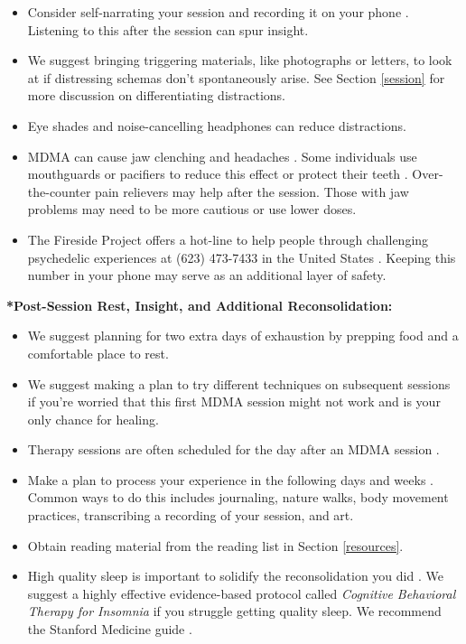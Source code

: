 \documentclass[12pt,letterpaper]{article}
\begin{document}
\begin{itemize}
    \item Consider self-narrating your session and recording it on your phone \cite{mithoeferManual}. Listening to this after the session can spur insight.
    \item We suggest bringing triggering materials, like photographs or letters, to look at if distressing schemas don't spontaneously arise. See Section \ref{session} for more discussion on differentiating distractions.
    \item Eye shades and noise-cancelling headphones can reduce distractions.
    \item MDMA can cause jaw clenching and headaches \cite{mitchellMDMAClinicalTrial2,liechtiGender}. Some individuals use mouthguards or pacifiers to reduce this effect or protect their teeth \cite{emdeEmergency}. Over-the-counter pain relievers may help after the session. Those with jaw problems may need to be more cautious or use lower doses. 
    \item The Fireside Project offers a hot-line to help people through challenging psychedelic experiences at (623) 473-7433 in the United States \cite{firesideProject}. Keeping this number in your phone may serve as an additional layer of safety.
\end{itemize}
\noindent \textbf{*Post-Session Rest, Insight, and Additional Reconsolidation:}
\begin{itemize}
    \item We suggest planning for two extra days of exhaustion by prepping food and a comfortable place to rest. 
    \item We suggest making a plan to try different techniques on subsequent sessions if you're worried that this first MDMA session might not work and is your only chance for healing.
    \item Therapy sessions are often scheduled for the day after an MDMA session \cite{mithoeferManual}. 
    \item Make a plan to process your experience in the following days and weeks \cite{mithoeferManual}. Common ways to do this includes journaling, nature walks, body movement practices, transcribing a recording of your session, and art. 
    \item Obtain reading material from the reading list in Section \ref{resources}.
    \item High quality sleep is important to solidify the reconsolidation you did \cite{walkerSleep}. We suggest a highly effective evidence-based protocol called \textit{Cognitive Behavioral Therapy for Insomnia} if you struggle getting quality sleep. We recommend the Stanford Medicine guide \cite{stanfordSleep}.
\end{itemize}
\end{document}
